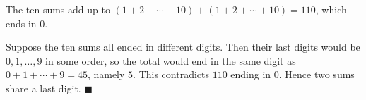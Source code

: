 The ten sums add up to $(1+2+\cdots+10)+(1+2+\cdots+10)=110$, which ends in $0$.

Suppose the ten sums all ended in different digits. Then their last digits would be $0,1,\dots,9$ in some order, so the total would end in the same digit as $0+1+\cdots+9=45$, namely $5$. This contradicts $110$ ending in $0$. Hence two sums share a last digit. $\blacksquare$
